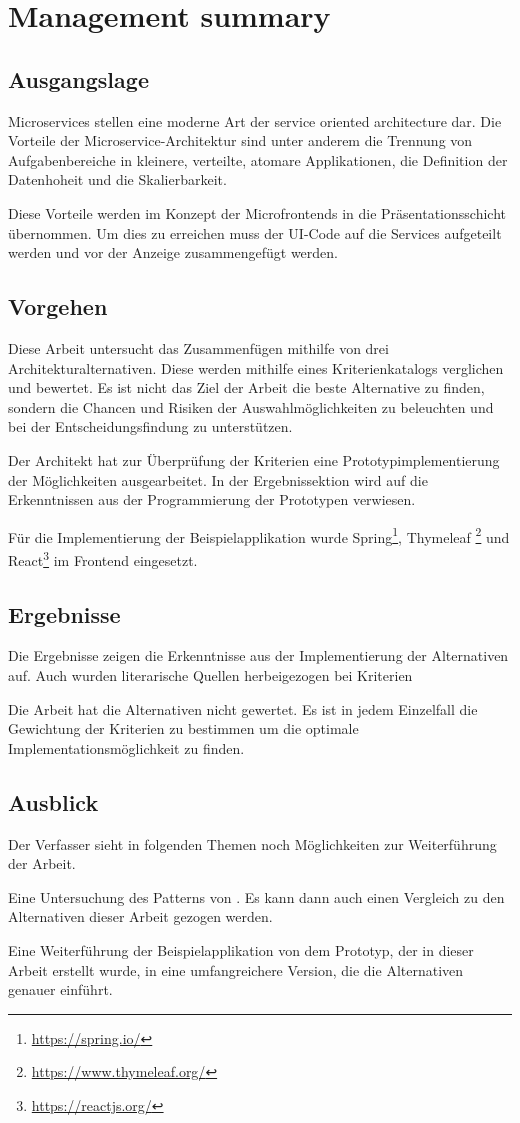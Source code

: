 \section*{Management summary}

\subsection*{Ausgangslage}
Microservices stellen eine moderne Art der service oriented architecture dar. Die Vorteile der Microservice-Architektur sind unter anderem die Trennung von Aufgabenbereiche in kleinere, verteilte, atomare Applikationen, die Definition der Datenhoheit und die Skalierbarkeit.

Diese Vorteile werden im Konzept der Microfrontends in die Präsentationsschicht übernommen. Um dies zu erreichen muss der \ac{UI}-Code auf die Services aufgeteilt werden und vor der Anzeige zusammengefügt werden.

\subsection*{Vorgehen}
Diese Arbeit untersucht das Zusammenfügen mithilfe von drei Architekturalternativen. Diese werden mithilfe eines Kriterienkatalogs verglichen und bewertet. Es ist nicht das Ziel der Arbeit die beste Alternative zu finden, sondern die Chancen und Risiken der Auswahlmöglichkeiten zu beleuchten und bei der Entscheidungsfindung zu unterstützen.

Der Architekt hat zur Überprüfung der Kriterien eine Prototypimplementierung der Möglichkeiten ausgearbeitet. In der Ergebnissektion wird auf die Erkenntnissen aus der Programmierung der Prototypen verwiesen.

Für die Implementierung der Beispielapplikation wurde Spring\footnote{\url{https://spring.io/}}, Thymeleaf \footnote{\url{https://www.thymeleaf.org/}} und React\footnote{\url{https://reactjs.org/}} im Frontend eingesetzt.

\subsection*{Ergebnisse}
Die Ergebnisse zeigen die Erkenntnisse aus der Implementierung der Alternativen auf. Auch wurden literarische Quellen herbeigezogen bei Kriterien 

Die Arbeit hat die Alternativen nicht gewertet. Es ist in jedem Einzelfall die Gewichtung der Kriterien zu bestimmen um die optimale Implementationsmöglichkeit zu finden.

\subsection*{Ausblick}
Der Verfasser sieht in folgenden Themen noch Möglichkeiten zur Weiterführung der Arbeit.

Eine Untersuchung des  Patterns von \citeauthor{newman2015}. Es kann dann auch einen Vergleich zu den Alternativen dieser Arbeit gezogen werden.

Eine Weiterführung der Beispielapplikation von dem Prototyp, der in dieser Arbeit erstellt wurde, in eine umfangreichere Version, die die Alternativen genauer einführt.